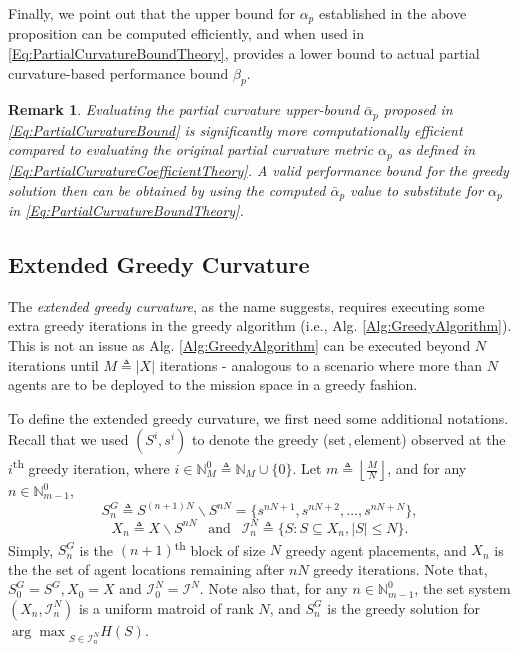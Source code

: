 \documentclass[letterpaper, 10 pt, conference]{ieeeconf}
\newcommand{\N}{\mathbb{N}}
\newcommand{\tsup}[1]{\textsuperscript{#1}}
\newtheorem{remark}{Remark}
\begin{document}
Finally, we point out that the upper bound for $\alpha_p$ established in the above proposition can be computed efficiently, and when used in \eqref{Eq:PartialCurvatureBoundTheory}, provides a lower bound to actual partial curvature-based performance bound $\beta_p$. 


\begin{remark}
Evaluating the partial curvature upper-bound $\bar{\alpha}_p$ proposed in \eqref{Eq:PartialCurvatureBound} is significantly more computationally efficient compared to evaluating the original partial curvature metric $\alpha_p$ as defined in \eqref{Eq:PartialCurvatureCoefficientTheory}. A valid performance bound for the greedy solution then can be obtained by using the computed $\bar{\alpha}_p$ value to substitute for $\alpha_p$ in \eqref{Eq:PartialCurvatureBoundTheory}. 
\end{remark}

\subsection{Extended Greedy Curvature \cite{WelikalaJ02021}}\label{SubSec:ExtendedGreedyCurvature}

The \emph{extended greedy curvature}, as the name suggests, requires executing some extra greedy iterations in the greedy algorithm (i.e., Alg. \ref{Alg:GreedyAlgorithm}). This is not an issue as Alg. \ref{Alg:GreedyAlgorithm} can be executed beyond $N$ iterations until $M \triangleq \vert X \vert$ iterations - analogous to a scenario where more than $N$ agents are to be deployed to the mission space in a greedy fashion. 

To define the extended greedy curvature, we first need some additional notations. Recall that we used $(S^i,s^i)$ to denote the greedy (set\,,\,element) observed at the $i$\tsup{th} greedy iteration, where $i\in \N_M^0 \triangleq \N_M \cup\{0\}$. Let $m \triangleq \left \lfloor{\frac{M}{N}}\right \rfloor$, and for any $n\in \N_{m-1}^0$, 
\begin{equation}\label{Eq:GreedySolutionBlock}
    S^G_n \triangleq S^{(n+1)N} \backslash S^{nN} = \{s^{nN+1},s^{nN+2},\ldots,s^{nN+N}\}, 
\end{equation}
\begin{equation}\label{Eq:groundSetBlock}
X_n \triangleq X\backslash S^{nN} \ \ \mbox{ and } \ \  
\mathcal{I}_n^N \triangleq \{S:S \subseteq X_n, \vert S \vert \leq N\}.   
\end{equation}
Simply, $S^G_n$ is the $(n+1)$\tsup{th} block of size $N$ greedy agent placements, and $X_n$ is the the set of agent locations remaining after $nN$ greedy iterations. Note that, $S^G_0 = S^G, X_0 = X$ and $\mathcal{I}_0^N = \mathcal{I}^N$. Note also that, for any $n\in\N_{m-1}^0$, the set system $(X_n,\mathcal{I}_n^N)$ is a uniform matroid of rank $N$, and $S^G_n$ is the greedy solution for ${\arg\max}_{S\in\mathcal{I}_n^N} H(S)$.
\end{document}
